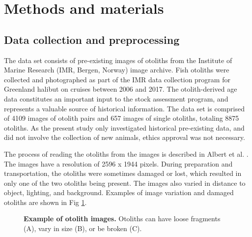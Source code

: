 \documentclass[10pt,letterpaper]{article}
\begin{document}
\section*{Methods and materials}

\subsection*{Data collection and preprocessing}

The data set consists of pre-existing images of otoliths from the Institute of Marine Research (IMR, Bergen, Norway) image archive.  
Fish otoliths were collected and photographed as part of the IMR data collection program for Greenland halibut on cruises between 2006 and 2017. The otolith-derived age data constitutes an important input to the stock assessment program, and represents a valuable source of historical information.
The data set is comprised of 4109 images of otolith pairs and 657 images of single otoliths, totaling 8875 otoliths.
As the present study only investigated historical pre-existing data, and did not involve the collection of new animals, ethics approval was not necessary.

The process of reading the otoliths from the images is described in Albert et al. \citep{albert2009towards}. The images have a resolution of 2596 x 1944 pixels. During preparation and transportation, the otoliths were sometimes damaged or lost, which resulted in only one of the two otoliths being present. The images also varied in distance to object, lighting, and background. Examples of image variation and damaged otoliths are shown in
Fig \ref{fig:otoliths}.

\begin{figure}[H]
  \centering
  \caption{\textbf{Example of otolith images.}  Otoliths can have loose fragments (A), vary in size (B), or be broken (C).}  %
  \label{fig:otoliths}
\end{figure}
\end{document}
